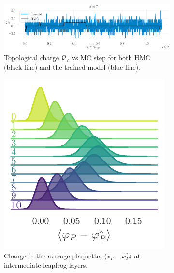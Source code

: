 \documentclass{article} %
\begin{document}
\begin{figure}[htpb]
\begin{subfigure}{0.65\textwidth}
   \end{subfigure}
   \hfill
   \begin{subfigure}{\textwidth}
      \includegraphics[width=\textwidth]{figures/topological_freezing_anl_blue_wide.pdf}
      \caption{\label{fig:topological_freezing}Topological charge \(\mathcal{Q}_{\mathbb{Z}}\) vs MC
      step for both HMC (black line) and the trained model (blue line).}%
   \end{subfigure}
   \hfill
   \begin{subfigure}{0.31\textwidth}
      \includegraphics[width=\textwidth]{figures/plaqsf_1758.pdf}
      \caption{\label{fig:plaqsf}Change in the average plaquette, \(\langle x_{P}-x_{P}^{*}\rangle\) at intermediate leapfrog layers.}
   \end{subfigure}
   \hfill
   \begin{subfigure}{0.31\textwidth}

\end{subfigure}
\end{figure}
\end{document}
